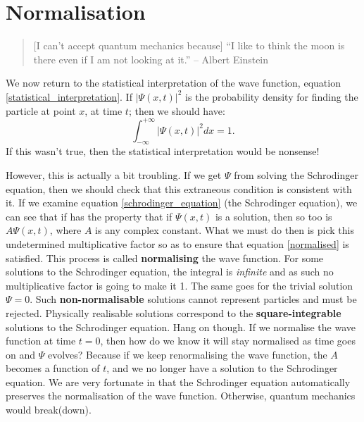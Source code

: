 \documentclass{article}
\begin{document}
\section{Normalisation}
\begin{quote}
[I can't accept quantum mechanics because] ``I like to think the moon is there even if I am not looking at it.'' -- Albert Einstein
\end{quote}
We now return to the statistical interpretation of the wave function, equation \ref{statistical_interpretation}. If $|\Psi (x,t)|^{2}$ is the probability density for finding the particle at point $x$, at time $t$; then we should have:
\begin{equation}
\label{normalised}
\boxed{\int_{-\infty}^{+\infty} \left| \Psi (x,t) \right|^{2}dx = 1.}
\end{equation}
If this wasn't true, then the statistical interpretation would be nonsense!

However, this is actually a bit troubling. If we get $\Psi$ from solving the Schrodinger equation, then we should check that this extraneous condition is consistent with it. If we examine equation \ref{schrodinger_equation} (the Schrodinger equation), we can see that if has the property that if $\Psi(x,t)$ is a solution, then so too is $A \Psi(x,t)$, where $A$ is any complex constant. What we must do then is pick this undetermined multiplicative factor so as to ensure that equation \ref{normalised} is satisfied. This process is called \textbf{normalising} the wave function. For some solutions to the Schrodinger equation, the integral is \emph{infinite} and as such no multiplicative factor is going to make it 1. The same goes for the trivial solution $\Psi = 0$. Such \textbf{non-normalisable} solutions cannot represent particles and must be rejected. Physically realisable solutions correspond to the \textbf{square-integrable} solutions to the Schrodinger equation. Hang on though. If we normalise the wave function at time $t=0$, then how do we know it will stay normalised as time goes on and $\Psi$ evolves? Because if we keep renormalising the wave function, the $A$ becomes a function of $t$, and we no longer have a solution to the Schrodinger equation. We are very fortunate in that the Schrodinger equation automatically preserves the normalisation of the wave function. Otherwise, quantum mechanics would break(down).
\end{document}
